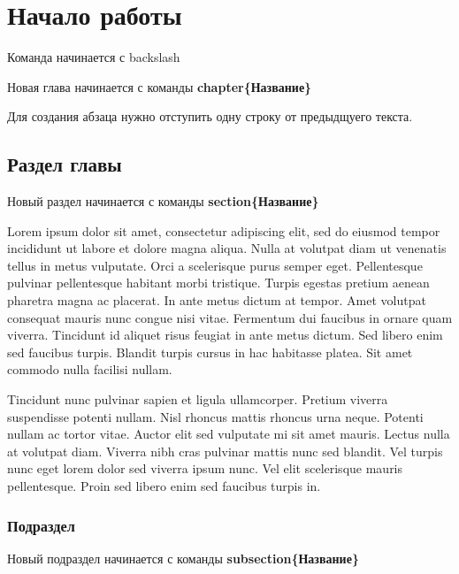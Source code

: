 \chapter{Начало работы}

Команда начинается с backslash

Новая глава начинается с команды \textbf{chapter\{Название\}}

Для создания абзаца нужно отступить одну строку от предыдщуего текста.

\section{Раздел главы}
Новый раздел начинается с команды \textbf{section\{Название\}}

Lorem ipsum dolor sit amet, consectetur adipiscing elit, sed do eiusmod tempor incididunt ut labore et dolore magna aliqua. Nulla at volutpat diam ut venenatis tellus in metus vulputate. Orci a scelerisque purus semper eget. Pellentesque pulvinar pellentesque habitant morbi tristique. Turpis egestas pretium aenean pharetra magna ac placerat. In ante metus dictum at tempor. Amet volutpat consequat mauris nunc congue nisi vitae. Fermentum dui faucibus in ornare quam viverra. Tincidunt id aliquet risus feugiat in ante metus dictum. Sed libero enim sed faucibus turpis. Blandit turpis cursus in hac habitasse platea. Sit amet commodo nulla facilisi nullam.

Tincidunt nunc pulvinar sapien et ligula ullamcorper. Pretium viverra suspendisse potenti nullam. Nisl rhoncus mattis rhoncus urna neque. Potenti nullam ac tortor vitae. Auctor elit sed vulputate mi sit amet mauris. Lectus nulla at volutpat diam. Viverra nibh cras pulvinar mattis nunc sed blandit. Vel turpis nunc eget lorem dolor sed viverra ipsum nunc. Vel elit scelerisque mauris pellentesque. Proin sed libero enim sed faucibus turpis in.

\subsection{Подраздел}
Новый подраздел начинается с команды \textbf{subsection\{Название\}}
